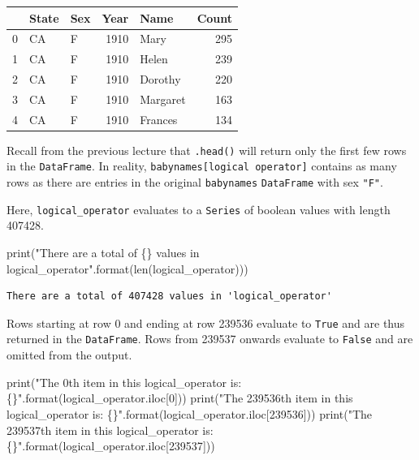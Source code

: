 \documentclass[
  letterpaper,
  DIV=11,
  numbers=noendperiod]{scrreprt}
\newenvironment{Shaded}{\begin{snugshade}}{\end{snugshade}}
\newcommand{\BuiltInTok}[1]{\textcolor[rgb]{0.00,0.23,0.31}{#1}}
\newcommand{\DecValTok}[1]{\textcolor[rgb]{0.68,0.00,0.00}{#1}}
\newcommand{\NormalTok}[1]{\textcolor[rgb]{0.00,0.23,0.31}{#1}}
\newcommand{\SpecialCharTok}[1]{\textcolor[rgb]{0.37,0.37,0.37}{#1}}
\newcommand{\StringTok}[1]{\textcolor[rgb]{0.13,0.47,0.30}{#1}}
\begin{document}
\begin{tabular}{lllrlr}
\toprule
{} & State & Sex &  Year &      Name &  Count \\
\midrule
0 &    CA &   F &  1910 &      Mary &    295 \\
1 &    CA &   F &  1910 &     Helen &    239 \\
2 &    CA &   F &  1910 &   Dorothy &    220 \\
3 &    CA &   F &  1910 &  Margaret &    163 \\
4 &    CA &   F &  1910 &   Frances &    134 \\
\bottomrule
\end{tabular}

Recall from the previous lecture that \texttt{.head()} will return only
the first few rows in the \texttt{DataFrame}. In reality,
\texttt{babynames{[}logical\ operator{]}} contains as many rows as there
are entries in the original \texttt{babynames} \texttt{DataFrame} with
sex \texttt{"F"}.

Here, \texttt{logical\_operator} evaluates to a \texttt{Series} of
boolean values with length 407428.

\begin{Shaded}
\begin{Highlighting}[]
\BuiltInTok{print}\NormalTok{(}\StringTok{"There are a total of }\SpecialCharTok{\{\}}\StringTok{ values in \textquotesingle{}logical\_operator\textquotesingle{}"}\NormalTok{.}\BuiltInTok{format}\NormalTok{(}\BuiltInTok{len}\NormalTok{(logical\_operator)))}
\end{Highlighting}
\end{Shaded}

\begin{verbatim}
There are a total of 407428 values in 'logical_operator'
\end{verbatim}

Rows starting at row 0 and ending at row 239536 evaluate to
\texttt{True} and are thus returned in the \texttt{DataFrame}. Rows from
239537 onwards evaluate to \texttt{False} and are omitted from the
output.

\begin{Shaded}
\begin{Highlighting}[]
\BuiltInTok{print}\NormalTok{(}\StringTok{"The 0th item in this \textquotesingle{}logical\_operator\textquotesingle{} is: }\SpecialCharTok{\{\}}\StringTok{"}\NormalTok{.}\BuiltInTok{format}\NormalTok{(logical\_operator.iloc[}\DecValTok{0}\NormalTok{]))}
\BuiltInTok{print}\NormalTok{(}\StringTok{"The 239536th item in this \textquotesingle{}logical\_operator\textquotesingle{} is: }\SpecialCharTok{\{\}}\StringTok{"}\NormalTok{.}\BuiltInTok{format}\NormalTok{(logical\_operator.iloc[}\DecValTok{239536}\NormalTok{]))}
\BuiltInTok{print}\NormalTok{(}\StringTok{"The 239537th item in this \textquotesingle{}logical\_operator\textquotesingle{} is: }\SpecialCharTok{\{\}}\StringTok{"}\NormalTok{.}\BuiltInTok{format}\NormalTok{(logical\_operator.iloc[}\DecValTok{239537}\NormalTok{]))}
\end{Highlighting}
\end{Shaded}
\end{document}
